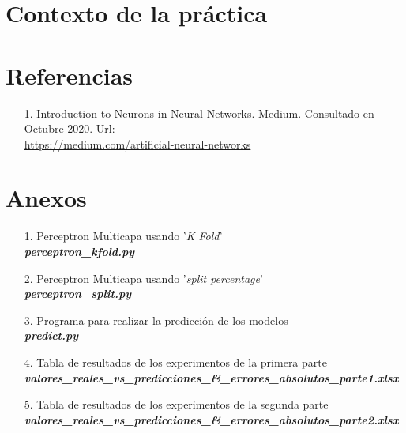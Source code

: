 \documentclass[12pt,a4paper, xcolor=table]{article}
\begin{document}
\section{Contexto de la práctica}


\clearpage

\section{Referencias}
    \begin{itemize}
        \item [1.] Introduction to Neurons in Neural Networks. Medium. Consultado en Octubre 2020. Url: \\
        \href{https://medium.com/artificial-neural-networks/introduction-to-neurons-in-neural-networks-71828d040a65}{https://medium.com/artificial-neural-networks}
    \end{itemize}
\printindex



  \section{Anexos}
  \begin{itemize}
    \item [1.] Perceptron Multicapa usando '\textit{K Fold}'\\
    \textbf{\textit{perceptron\_kfold.py}}
    \item [2.] Perceptron Multicapa usando '\textit{split percentage}'\\
    \textbf{\textit{perceptron\_split.py}}
    \item [3.] Programa para realizar la predicción de los modelos\\
    \textbf{\textit{predict.py}}
    \item [4.] Tabla de resultados de los experimentos de la primera parte\\
    \textbf{\textit{valores\_reales\_vs\_predicciones\_\&\_errores\_absolutos\_parte1.xlsx}}
    \item [5.] Tabla de resultados de los experimentos de la segunda parte\\
    \textbf{\textit{valores\_reales\_vs\_predicciones\_\&\_errores\_absolutos\_parte2.xlsx}}
  \end{itemize}
\end{document}
